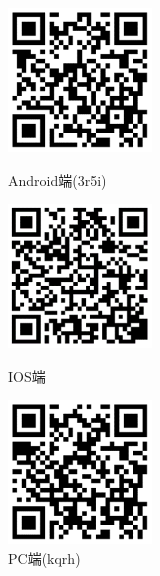 \documentclass[a4paper]{article}
\begin{document}
		\begin{figure}[t]
			\centering
			\begin{center}{}
				\begin{minipage}[t]{1.55in}
					\includegraphics[width=1.5in]{picture/Android.png}
					\caption*{\kaishu Android端(3r5i)}
				\end{minipage}
				\begin{minipage}[t]{1.55in}
					\includegraphics[width=1.5in]{picture/IOS.png}
					\caption*{\kaishu IOS端}
				\end{minipage}
				\begin{minipage}[t]{1.55in}
					\includegraphics[width=1.5in]{picture/PC.png}
					\caption*{\kaishu PC端(kqrh)}
				\end{minipage}
			\end{center}
		\end{figure}
\end{document}
